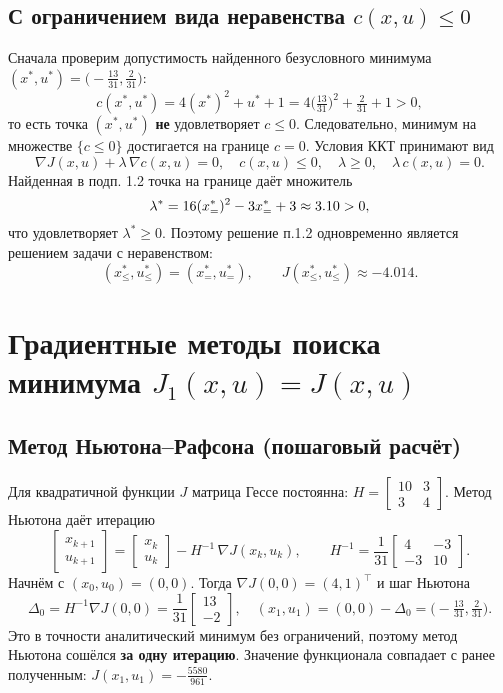 \subsection{С ограничением вида неравенства \(c(x,u)\le 0\)}
Сначала проверим допустимость найденного безусловного минимума \((x^{\ast},u^{\ast})=\big(-\tfrac{13}{31},\tfrac{2}{31}\big)\):
\[
 c(x^{\ast},u^{\ast})=4(x^{\ast})^2+u^{\ast}+1=4\Big(\tfrac{13}{31}\Big)^2+\tfrac{2}{31}+1>0,
\]
то есть точка \((x^{\ast},u^{\ast})\) \textbf{не} удовлетворяет \(c\le0\). Следовательно, минимум на множестве \(\{c\le0\}\) достигается на границе \(c=0\). Условия ККТ принимают вид
\[
\nabla J(x,u)+\lambda\,\nabla c(x,u)=0,\quad c(x,u)\le0,\quad \lambda\ge0,\quad \lambda\,c(x,u)=0.
\]
Найденная в подп. 1.2 точка на границе даёт множитель
\[\small
\lambda^{\ast}=16(x^{\ast}_{=})^2-3x^{\ast}_{=}+3\approx 3.10>0,
\]
что удовлетворяет \(\lambda^{\ast}\ge0\). Поэтому решение п.1.2 одновременно является решением задачи с неравенством:
\[
 (x^{\ast}_{\le},u^{\ast}_{\le})=(x^{\ast}_{=},u^{\ast}_{=}),\qquad J(x^{\ast}_{\le},u^{\ast}_{\le})\approx -4.014.
\]

\section{Градиентные методы поиска минимума \(J_1(x,u)=J(x,u)\)}
\subsection{Метод Ньютона–Рафсона (пошаговый расчёт)}
Для квадратичной функции \(J\) матрица Гессе постоянна: \(H=\begin{bmatrix}10&3\\3&4\end{bmatrix}\). Метод Ньютона даёт итерацию
\[
\begin{bmatrix}x_{k+1}\\ u_{k+1}\end{bmatrix}
=\begin{bmatrix}x_k\\ u_k\end{bmatrix}-H^{-1}\,\nabla J(x_k,u_k),\qquad H^{-1}=\frac{1}{31}\begin{bmatrix}4&-3\\-3&10\end{bmatrix}.
\]
Начнём с \((x_0,u_0)=(0,0)\). Тогда \(\nabla J(0,0)=(4,1)^\top\) и шаг Ньютона
\[
\Delta_0=H^{-1}\nabla J(0,0)=\frac{1}{31}\begin{bmatrix}13\\-2\end{bmatrix},\quad
(x_1,u_1)=(0,0)-\Delta_0=\Big(-\tfrac{13}{31},\tfrac{2}{31}\Big).
\]
Это в точности аналитический минимум без ограничений, поэтому метод Ньютона сошёлся \textbf{за одну итерацию}. Значение функционала совпадает с ранее полученным: \(J(x_1,u_1)=-\tfrac{5580}{961}\).

